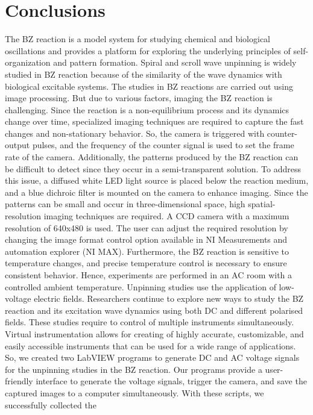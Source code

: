 \documentclass[journal=jacsat,manuscript=article]{achemso}
\begin{document}
\section{Conclusions} 
The BZ reaction is a model system for studying chemical and
biological oscillations and provides a platform for exploring the
underlying principles of self-organization and pattern
formation. Spiral and scroll wave unpinning is widely studied in BZ
reaction because of the similarity of the wave dynamics with
biological excitable systems.  The studies in BZ reactions are carried
out using image processing. But due to various factors, imaging the BZ
reaction is challenging. Since the reaction is a non-equilibrium
process and its dynamics change over time, specialized imaging
techniques are required to capture the fast changes and non-stationary
behavior. So, the camera is triggered with counter-output pulses, and
the frequency of the counter signal is used to set the frame rate of
the camera. Additionally, the patterns produced by the BZ reaction can
be difficult to detect since they occur in a semi-transparent
solution. To address this issue, a diffused white LED light source is
placed below the reaction medium, and a blue dichroic filter is
mounted on the camera to enhance imaging. Since the patterns can be
small and occur in three-dimensional space, high spatial-resolution
imaging techniques are required. A CCD camera with a maximum
resolution of 640x480 is used. The user can adjust the required
resolution by changing the image format control option available in NI
Measurements and automation explorer (NI MAX). Furthermore, the BZ
reaction is sensitive to temperature changes, and precise temperature
control is necessary to ensure consistent behavior. Hence, experiments
are performed in an AC room with a controlled ambient temperature.
Unpinning studies use the application of low-voltage electric
fields. Researchers continue to explore new ways to study the BZ
reaction and its excitation wave dynamics using both DC and different
polarised fields. These studies require to control of multiple
instruments simultaneously. Virtual instrumentation allows for
creating of highly accurate, customizable, and easily accessible
instruments that can be used for a wide range of applications. So, we
created two LabVIEW programs to generate DC and AC voltage signals for
the unpinning studies in the BZ reaction. Our programs provide a
user-friendly interface to generate the voltage signals, trigger the
camera, and save the captured images to a computer
simultaneously. With these scripts, we successfully collected the
\end{document}
